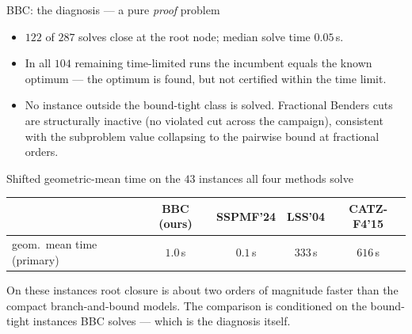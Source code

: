 \documentclass[10pt]{beamer}
\begin{document}
\begin{frame}{BBC: the diagnosis --- a pure \emph{proof} problem}
\begin{itemize}
  \item $122$ of $287$ solves close at the root node; median solve time $0.05$\,s.
  \item In all $104$ remaining time-limited runs the incumbent equals the known
        optimum --- the optimum is found, but not certified within the time limit.
  \item No instance outside the bound-tight class is solved. Fractional Benders cuts
        are structurally inactive (no violated cut across the campaign), consistent with
        the subproblem value collapsing to the pairwise bound at fractional orders.
\end{itemize}
\vspace{1mm}
\begin{block}{Shifted geometric-mean time on the $43$ instances all four methods solve}
\centering
\begin{tabular}{lcccc}
\toprule
 & BBC (ours) & SSPMF'24 & LSS'04 & CATZ-F4'15\\
\midrule
geom.\ mean time (primary) & $1.0$\,s & $0.1$\,s & $333$\,s & $616$\,s\\
\bottomrule
\end{tabular}
\end{block}
\begin{center}\footnotesize
On these instances root closure is about two orders of magnitude faster than the compact
branch-and-bound models. The comparison is conditioned on the bound-tight instances BBC
solves --- which is the diagnosis itself.
\end{center}
\end{frame}

\end{document}
